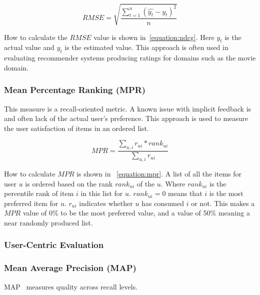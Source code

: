\begin{equation}
	RMSE = \sqrt{\frac{\sum_{t=1}^{n}{(\hat{y_t} - y_t)^{2}}}{n}}
\end{equation}

How to calculate the $RMSE$ value is shown in~\ref{equation:ndcg}.
Here $y_t$ is the actual value and $\hat{y_t}$ is the estimated value.
This approach is often used in evaluating recommender systems producing ratings for domains such as the movie domain.


\subsubsection{Mean Percentage Ranking (MPR)}
This measure is a recall-oriented metric.
A known issue with implicit feedback is and often lack of the actual user's preference.
This approach is used to measure the user satisfaction of items in an ordered list.

\begin{equation}
	MPR = \frac{\sum_{u,i}{r_{ui} * rank_{ui}}}{\sum_{u,i}{r_{ui}}}
	\label{equation:mpr}
\end{equation}

How to calculate $MPR$ is shown in ~\ref{equation:mpr}.
A list of all the items for user $u$ is ordered based on the rank $rank_{ui}$ of the $u$.
Where $rank_{ui}$ is the percentile rank of item $i$ in this list for $u$.
$rank_{ui} = 0$ means that $i$ is the most preferred item for $u$.
$r_{ui}$ indicates whether $u$ has consumed $i$ or not.
This makes a $MPR$ value of 0\% to be the most preferred value, and a value of 50\% meaning a near randomly produced list.


\subsubsection{User-Centric Evaluation}
\cite{Pu:2011:UEF:2043932.2043962}


\subsubsection{Mean Average Precision (MAP)}
MAP~\cite{Manning:2008:IIR:1394399} measures quality across recall levels.


